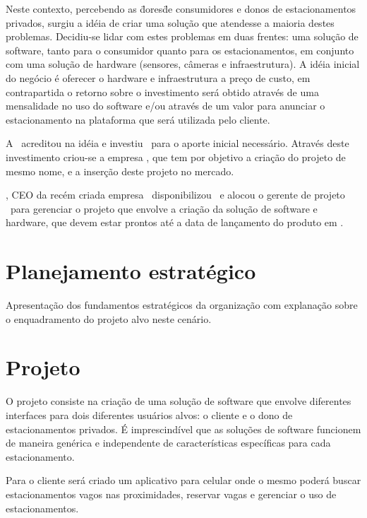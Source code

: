 Neste contexto, percebendo as \"dores\" de consumidores e donos de estacionamentos privados, surgiu a idéia de criar uma solução que atendesse a maioria destes problemas. Decidiu-se lidar com estes problemas em duas frentes: uma solução de software, tanto para o consumidor quanto para os estacionamentos, em conjunto com uma solução de hardware (sensores, câmeras e infraestrutura). A idéia inicial do negócio é oferecer o hardware e infraestrutura a preço de custo, em contrapartida o retorno sobre o investimento será obtido através de uma mensalidade no uso do software e/ou através de um valor para anunciar o estacionamento na plataforma que será utilizada pelo cliente.

A \investorCompanyName\ acreditou na idéia e investiu \ventureBudget\ para o aporte inicial necessário. Através deste investimento criou-se a empresa \startupCompanyName, que tem por objetivo a criação do projeto de mesmo nome, e a inserção deste projeto no mercado.

\ceoName, CEO da recém criada empresa \startupCompanyName\, disponibilizou \maximumBudget\ e alocou o gerente de projeto \projectManagerName\ para gerenciar o projeto que envolve a criação da solução de software e hardware, que devem estar prontos até a data de lançamento do produto em \maximumDeadline.

\section{Planejamento estratégico}

Apresentação dos fundamentos estratégicos da organização com explanação sobre o enquadramento do projeto alvo neste cenário.

\section{Projeto}

O projeto consiste na criação de uma solução de software que envolve diferentes interfaces para dois diferentes usuários alvos: o cliente e o dono de estacionamentos privados. É imprescindível que as soluções de software funcionem de maneira genérica e independente de características específicas para cada estacionamento. 

Para o cliente será criado um aplicativo para celular onde o mesmo poderá buscar estacionamentos vagos nas proximidades, reservar vagas e gerenciar o uso de estacionamentos.

